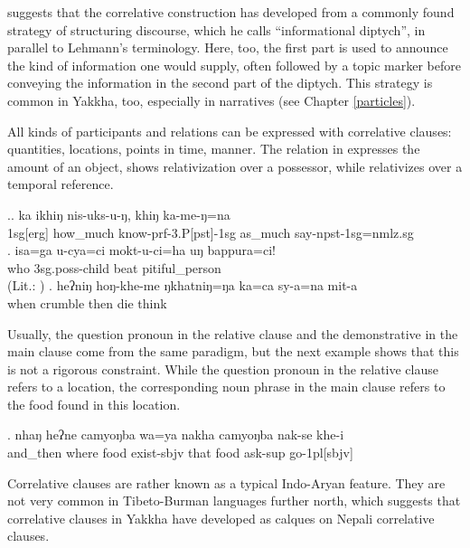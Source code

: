\citet[25]{Bickel1999Principles} suggests that the correlative construction has developed from a commonly found strategy of structuring discourse, which he calls “informational diptych”, in parallel to Lehmann's terminology. Here, too, the first part is used to announce the kind of information one would supply, often followed by a topic marker before conveying the information in the second part of the diptych. This strategy is common in Yakkha, too, especially in narratives (see Chapter \ref{particles}). 

All kinds of participants and relations can be expressed with correlative clauses: quantities, locations, points in time, manner. The relation in  \Next[a] expresses the amount of an object, \Next[b] shows relativization over a possessor, while \Next[c] relativizes over a temporal reference.

\ex.\ag. ka  ikhiŋ  nis-uks-u-ŋ, khiŋ  ka-me-ŋ=na\\
		{\sc 1sg[erg]} how\_much know{\sc -prf-3.P[pst]-1sg} as\_much say-{\sc npst-1sg=nmlz.sg}\\
		\bg.  isa=ga     u-cya=ci  mokt-u-ci=ha  uŋ  bappura=ci!\\
		who {\sc 3sg.poss-}child  beat  pitiful\_person\\
		 (Lit.: )
		\bg.  heʔniŋ  hoŋ-khe-me  ŋkhatniŋ=ŋa     ka=ca         sy-a=na                    mit-a\\
		when crumble then  die think\\
		
	
Usually, the question pronoun in the relative clause and the demonstrative in the main clause come from the same paradigm, but the next example shows that this is not a rigorous constraint. While the question pronoun in the relative clause refers to a location, the corresponding noun phrase in the main clause refers to the food found in this location.	
		
	\exg. nhaŋ   heʔne  camyoŋba wa=ya nakha camyoŋba nak-se khe-i\\
		and\_then where food exist{\sc [3sg]-sbjv} that  food ask-{\sc sup} go{\sc -1pl[sbjv]}\\
		 


Correlative clauses are rather known as a typical Indo-Aryan feature. They are not very common in Tibeto-Burman languages further north, which suggests that correlative clauses in Yakkha have developed as calques on Nepali correlative clauses. 
 